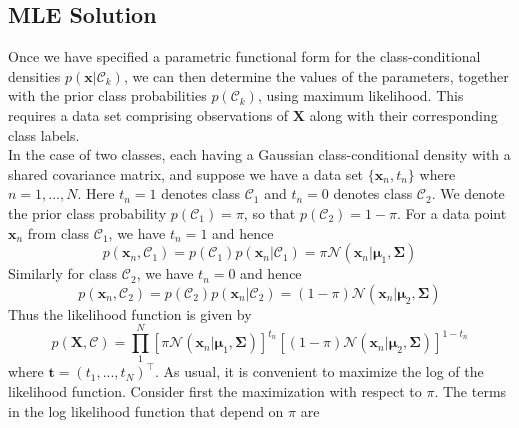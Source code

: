 \documentclass[twoside]{article}
\begin{document}
\subsection{MLE Solution}
Once we have specified a parametric functional form for the class-conditional densities $p(\boldsymbol{x}|\mathcal{C}_k)$, we can then determine the values of the parameters, together with the prior class probabilities $p(\mathcal{C}_k)$, using maximum likelihood. This requires a data set comprising observations of $\boldsymbol{X}$ along with their corresponding class labels.\\
In the case of two classes, each having a Gaussian class-conditional density with a shared covariance matrix, and suppose we have a data set $\{\boldsymbol{x}_n, t_n\}$ where $n = 1,..., N$. Here $t_n = 1$ denotes class $\mathcal{C}_1$ and $t_n = 0$ denotes class $\mathcal{C}_2$. We denote the prior class probability $p(\mathcal{C}_1) = \pi$, so that $p(\mathcal{C}_2) = 1 - \pi$. For a data point $\boldsymbol{x}_n$ from class $\mathcal{C}_1$, we have $t_n = 1$ and hence
\begin{equation*}
    p(\boldsymbol{x}_n, \mathcal{C}_1) = p(\mathcal{C}_1)p(\boldsymbol{x}_n| \mathcal{C}_1)=\pi\mathcal{N}(\boldsymbol{x}_n|\boldsymbol{\mu}_1, \boldsymbol{\Sigma})
\end{equation*}
Similarly for class $\mathcal{C}_2$, we have $t_n = 0$ and hence
\begin{equation*}
     p(\boldsymbol{x}_n, \mathcal{C}_2) = p(\mathcal{C}_2)p(\boldsymbol{x}_n| \mathcal{C}_2)=(1 -\pi)\mathcal{N}(\boldsymbol{x}_n|\boldsymbol{\mu}_2, \boldsymbol{\Sigma})
\end{equation*}
Thus the likelihood function is given by
\begin{equation*}
    p(\boldsymbol{X}, \boldsymbol{\mathcal{C}}) = \prod_1^N
    [\pi\mathcal{N}(\boldsymbol{x}_n|\boldsymbol{\mu}_1, \boldsymbol{\Sigma})]^{t_n} [(1 -\pi)\mathcal{N}(\boldsymbol{x}_n|\boldsymbol{\mu}_2, \boldsymbol{\Sigma})]^{1-t_n}
\end{equation*}
where $\boldsymbol{t} = (t_1,...,t_N)^\intercal$. As usual, it is convenient to maximize the log of the likelihood function. Consider first the maximization with respect to $\pi$. The terms in the log likelihood function that depend on $\pi$ are
\end{document}
